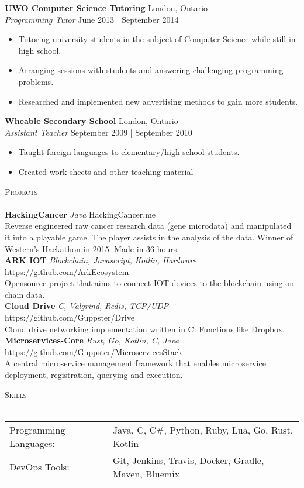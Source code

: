 \documentclass[a4paper]{article}
\newcommand{\lineunder} {
    \vspace*{-8pt} \\
    \hspace*{-18pt} \hrulefill \\
}
\newcommand{\header} [1] {
    {\hspace*{-18pt}\vspace*{6pt} \textsc{#1}}
    \vspace*{-6pt} \lineunder
}
\begin{document}
\textbf{UWO Computer Science Tutoring} \hfill London, Ontario\\
\textit{Programming Tutor} \hfill June 2013 | September 2014\\
\vspace{-1mm}
\begin{itemize} \itemsep 1pt
	\item Tutoring university students in the subject of Computer Science while still in high school.
	\item Arranging sessions with students and answering challenging programming problems.
	\item Researched and implemented new advertising methods to gain more students.
\end{itemize}

\textbf{Wheable Secondary School} \hfill London, Ontario\\
\textit{Assistant Teacher} \hfill September 2009 | September 2010\\
\vspace{-1mm}
\begin{itemize} \itemsep 1pt
	\item Taught foreign languages to elementary/high school students.
	\item Created work sheets and other teaching material
\end{itemize}

\header{Projects}
{\textbf{HackingCancer} \sl Java} \hfill HackingCancer.me\\
Reverse engineered raw cancer research data (gene microdata) and manipulated it into a playable game. The player assists in the analysis of the data. Winner of Western’s Hackathon in 2015. Made in 36 hours.\\
\vspace*{2mm}
{\textbf{ARK IOT} \sl Blockchain, Javascript, Kotlin, Hardware} \hfill https://github.com/ArkEcosystem\\
Opensource project that aims to connect IOT devices to the blockchain using on-chain data.\\
\vspace*{2mm}
{\textbf{Cloud Drive} \sl C, Valgrind, Redis, TCP/UDP} \hfill https://github.com/Guppster/Drive\\
Cloud drive networking implementation written in C. Functions like Dropbox.\\
\vspace*{2mm}
{\textbf{Microservices-Core} \sl Rust, Go, Kotlin, C, Java} \hfill https://github.com/Guppster/MicroservicesStack\\
A central microservice management framework that enables microservice deployment, registration, querying and execution.\\

\vspace*{2mm}

\header{Skills}
\begin{tabular}{ l l }
	Programming Languages: & Java, C, C\#, Python, Ruby, Lua, Go, Rust, Kotlin    \\
	DevOps Tools:          & Git, Jenkins, Travis, Docker, Gradle, Maven, Bluemix \\
\end{tabular}

\vspace*{2mm}

\vspace*{2mm}
        

\ 
\end{document}
